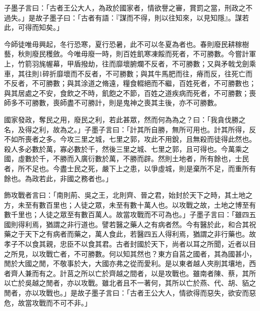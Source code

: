 
\begin{pinyinscope}
子墨子言曰：「古者王公大人，為政於國家者，情欲譽之審，賞罰之當，刑政之不過失。」是故子墨子曰：「古者有語：『謀而不得，則以往知來，以見知隱』。謀若此，可得而知矣。」

今師徒唯毋興起，冬行恐寒，夏行恐暑，此不可以冬夏為者也。春則廢民耕稼樹藝，秋則廢民穫斂。今唯毋廢一時，則百姓飢寒凍餒而死者，不可勝數。今嘗計軍上，竹箭羽旄幄幕，甲盾撥劫，往而靡壞腑爛不反者，不可勝數；又與矛戟戈劍乘車，其往則1碎折靡壞而不反者，不可勝數；與其牛馬肥而往，瘠而反，往死亡而不反者，不可勝數；與其涂道之脩遠，糧食輟絕而不繼，百姓死者，不可勝數也；與其居處之不安，食飲之不時，飢飽之不節，百姓之道疾病而死者，不可勝數；喪師多不可勝數，喪師盡不可勝計，則是鬼神之喪其主後，亦不可勝數。

國家發政，奪民之用，廢民之利，若此甚眾，然而何為為之？曰：「我貪伐勝之名，及得之利，故為之。」子墨子言曰：「計其所自勝，無所可用也。計其所得，反不如所喪者之多。今攻三里之城，七里之郭，攻此不用銳，且無殺而徒得此然也。殺人多必數於萬，寡必數於千，然後三里之城、七里之郭，且可得也。今萬乘之國，虛數於千，不勝而入廣衍數於萬，不勝而辟。然則土地者，所有餘也，士民者，所不足也。今盡士民之死，嚴下上之患，以爭虛城，則是棄所不足，而重所有餘也。為政若此，非國之務者也。」

飾攻戰者言曰：「南則荊、吳之王，北則齊、晉之君，始封於天下之時，其土地之方，未至有數百里也；人徒之眾，未至有數十萬人也。以攻戰之故，土地之博至有數千里也；人徒之眾至有數百萬人。故當攻戰而不可為也。」子墨子言曰：「雖四五國則得利焉，猶謂之非行道也。譬若醫之藥人之有病者然。今有醫於此，和合其祝藥之于天下之有病者而藥之，萬人食此，若醫四五人得利焉，猶謂之非行藥也。故孝子不以食其親，忠臣不以食其君。古者封國於天下，尚者以耳之所聞，近者以目之所見，以攻戰亡者，不可勝數。何以知其然也？東方自莒之國者，其為國甚小，閒於大國之閒，不敬事於大，大國亦弗之從而愛利。是以東者越人夾削其壤地，西者齊人兼而有之。計莒之所以亡於齊越之間者，以是攻戰也。雖南者陳、蔡，其所以亡於吳越之閒者，亦以攻戰。雖北者且不一著何，其所以亡於燕、代、胡、貊之閒者，亦以攻戰也。」是故子墨子言曰：「古者王公大人，情欲得而惡失，欲安而惡危，故當攻戰而不可不非。」


\end{pinyinscope}
